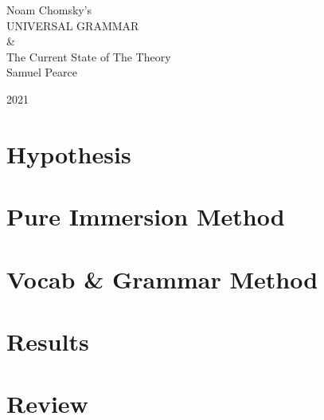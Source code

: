 \documentclass[a4paper,10pt]{article}
\begin{document}
\begingroup%
\centering
\vfill
\Huge{Noam Chomsky's}\\[0.5\baselineskip]
\Huge {UNIVERSAL GRAMMAR}\\
\Huge{\&}\\
\Huge{The Current State of The Theory}\\[\baselineskip]
\Large {Samuel Pearce}\par
\large{\scshape 2021}\par
\vfill\null
\endgroup

\begin{abstract}
    
\end{abstract}

\pagebreak


\tableofcontents
\pagebreak


\section{Hypothesis}


\section{Pure Immersion Method}


\section{Vocab \& Grammar Method}


\section{Results}


\section{Review}
\end{document}
